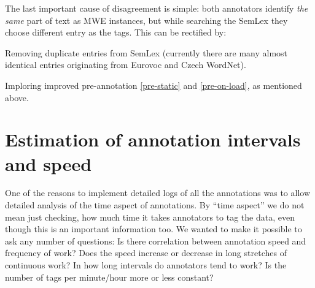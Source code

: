 The last important cause of disagreement is simple: both annotators identify \emph{the same} part of text as MWE instances, but while searching the SemLex they choose different entry as the tags. This can be rectified by:
	\begin{compactitem}
		\item Removing duplicate entries from SemLex (currently there are many almost identical entries originating from Eurovoc and Czech WordNet).
		\item Imploring improved pre-annotation \ref{pre-static} and \ref{pre-on-load}, as mentioned above.
	\end{compactitem}

%

\section{Estimation of annotation intervals and speed}
\label{sec:time-analysis}

One of the reasons to implement detailed logs of all the annotations  was to allow detailed analysis of the time aspect of annotations. By ``time aspect'' we do not mean just checking, how much time it takes annotators to tag the data, even though this is an important information too. We wanted to make it possible to ask any number of questions: Is there correlation between annotation speed and frequency of work? Does the speed increase or decrease in long stretches of continuous work? In how long intervals do annotators tend to work? Is the number of tags per minute/hour more or less constant?  

